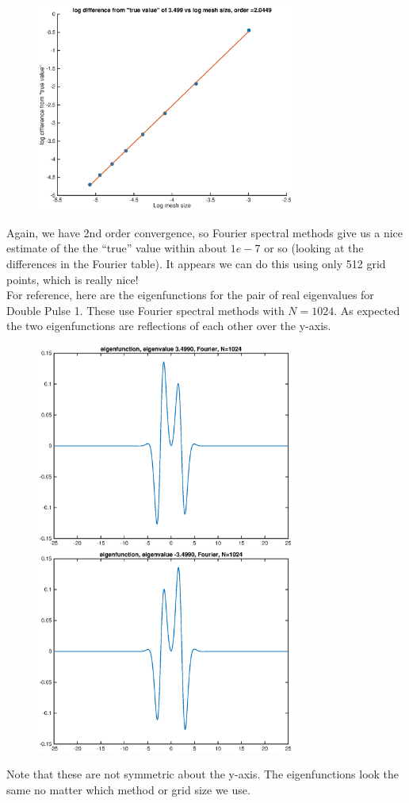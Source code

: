 \documentclass[12pt]{article}
\begin{document}
\begin{figure}[H]
\includegraphics[width=8.5cm]{1double1fdeigtrue}
\end{figure}

Again, we have 2nd order convergence, so Fourier spectral methods give us a nice estimate of the the ``true'' value within about $1e-7$ or so (looking at the differences in the Fourier table). It appears we can do this using only 512 grid points, which is really nice!\\

For reference, here are the eigenfunctions for the pair of real eigenvalues for Double Pulse 1. These use Fourier spectral methods with $N = 1024$. As expected the two eigenfunctions are reflections of each other over the y-axis.
\begin{figure}[H]
\includegraphics[width=8.5cm]{1double1fouriereigenfnplus}
\includegraphics[width=8.5cm]{1double1fouriereigenfnminus}
\end{figure}
Note that these are not symmetric about the y-axis. The eigenfunctions look the same no matter which method or grid size we use.
\end{document}
